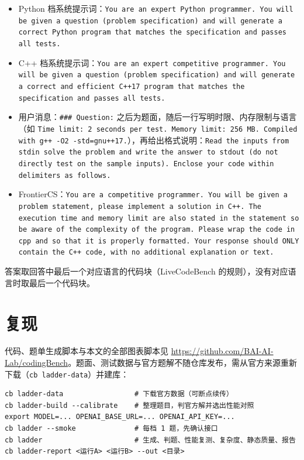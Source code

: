 \documentclass[11pt,a4paper,fontset=none]{ctexart}
\begin{document}
{\raggedright\small
\begin{itemize}[leftmargin=1.6em]
  \item Python 档系统提示词：\texttt{You are an expert Python programmer. You will be given a question (problem specification) and will generate a correct Python program that matches the specification and passes all tests.}
  \item C++ 档系统提示词：\texttt{You are an expert competitive programmer. You will be given a question (problem specification) and will generate a correct and efficient C++17 program that matches the specification and passes all tests.}
  \item 用户消息：\texttt{\#\#\# Question:} 之后为题面，随后一行写明时限、内存限制与语言（如 \texttt{Time limit: 2 seconds per test. Memory limit: 256 MB. Compiled with g++ -O2 -std=gnu++17.}），再给出格式说明：\texttt{Read the inputs from stdin solve the problem and write the answer to stdout (do not directly test on the sample inputs). Enclose your code within delimiters as follows.}
  \item FrontierCS：\texttt{You are a competitive programmer. You will be given a problem statement, please implement a solution in C++. The execution time and memory limit are also stated in the statement so be aware of the complexity of the program. Please wrap the code in \textasciigrave\textasciigrave\textasciigrave cpp and \textasciigrave\textasciigrave\textasciigrave{} so that it is properly formatted. Your response should ONLY contain the C++ code, with no additional explanation or text.}
\end{itemize}
\par}

答案取回答中最后一个对应语言的代码块（LiveCodeBench 的规则），没有对应语言时取最后一个代码块。

\section{复现}
\label{app:repro}

代码、题单生成脚本与本文的全部图表脚本见 \url{https://github.com/BAI-AI-Lab/codingBench}。题面、测试数据与官方题解不随仓库发布，需从官方来源重新下载（\texttt{cb ladder-data}）并建库：

\begin{small}
\begin{verbatim}
cb ladder-data                 # 下载官方数据（可断点续传）
cb ladder-build --calibrate    # 整理题目，判官方解并选出性能对照
export MODEL=... OPENAI_BASE_URL=... OPENAI_API_KEY=...
cb ladder --smoke              # 每档 1 题，先确认接口
cb ladder                      # 生成、判题、性能复测、复杂度、静态质量、报告
cb ladder-report <运行A> <运行B> --out <目录>
\end{verbatim}
\end{small}
\end{document}
